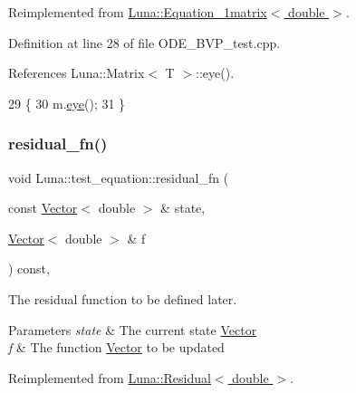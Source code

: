Reimplemented from \hyperlink{classLuna_1_1Equation__1matrix_a2501535a6e92abc491bc491b3f64dc06}{Luna\+::\+Equation\+\_\+1matrix$<$ double $>$}.



Definition at line 28 of file O\+D\+E\+\_\+\+B\+V\+P\+\_\+test.\+cpp.



References Luna\+::\+Matrix$<$ T $>$\+::eye().


\begin{DoxyCode}
29       \{
30         m.\hyperlink{classLuna_1_1Matrix_a1b5fc5d3bfd1b03e04def5d314174be6}{eye}();
31       \}
\end{DoxyCode}
\mbox{\label{classLuna_1_1test__equation_a90a4576ce51729e49dbe67f36ab31f81}} 
\subsubsection{\texorpdfstring{residual\+\_\+fn()}{residual\_fn()}}
{\footnotesize\ttfamily void Luna\+::test\+\_\+equation\+::residual\+\_\+fn (\begin{DoxyParamCaption}\item[{const \hyperlink{classLuna_1_1Vector}{Vector}$<$ double $>$ \&}]{state,  }\item[{\hyperlink{classLuna_1_1Vector}{Vector}$<$ double $>$ \&}]{f }\end{DoxyParamCaption}) const\hspace{0.3cm}{\ttfamily [inline]}, {\ttfamily [virtual]}}



The residual function to be defined later. 


\begin{DoxyParams}{Parameters}
{\em state} & The current state \hyperlink{classLuna_1_1Vector}{Vector} \\
\hline
{\em f} & The function \hyperlink{classLuna_1_1Vector}{Vector} to be updated \\
\hline
\end{DoxyParams}


Reimplemented from \hyperlink{classLuna_1_1Residual_ae1b1ebe3314c788b176bcac7b328de5c}{Luna\+::\+Residual$<$ double $>$}.



